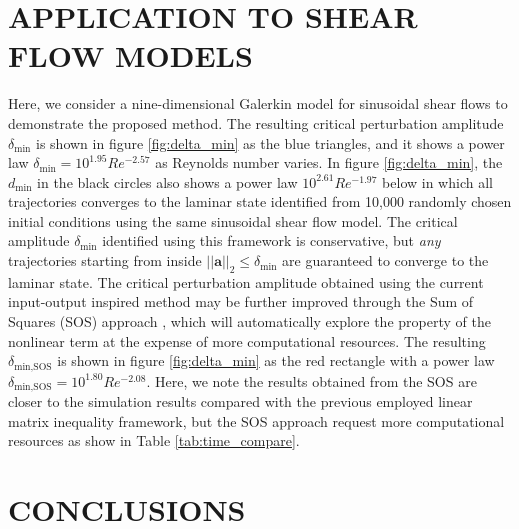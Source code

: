 \documentclass[10pt, a4paper]{article}
\begin{document}
\vspace{-2mm}
\section{APPLICATION TO SHEAR FLOW MODELS}
\vspace{-2mm}



Here, we consider a nine-dimensional Galerkin model \citep{Moehlis2004} for sinusoidal shear flows to demonstrate the proposed method. The resulting critical perturbation amplitude $\delta_{\text{min}}$ is shown in figure \ref{fig:delta_min} as the blue triangles, and it shows a power law $\delta_{\text{min}}=10^{1.95}Re^{-2.57}$ as Reynolds number varies. In figure \ref{fig:delta_min}, the $d_{\text{min}}$ in the black circles also shows a power law $10^{2.61}Re^{-1.97}$ below in which all trajectories converges to the laminar state identified from 10,000 randomly chosen initial conditions \citep{Joglekar2015} using the same sinusoidal shear flow model. The critical amplitude $\delta_{\text{min}}$ identified using this framework is conservative, but \emph{any} trajectories starting from inside $||\boldsymbol{a}||_2\leq \delta_{\text{min}}$ are guaranteed to converge to the laminar state. The critical perturbation amplitude obtained using the current input-output inspired method may be further improved through the Sum of Squares (SOS) approach \citep{papachristodoulou2013sostools}, which will automatically explore the property of the nonlinear term at the expense of more computational resources. The resulting $\delta_{\text{min,SOS}}$ is shown in figure \ref{fig:delta_min} as the red rectangle with a power law $\delta_{\text{min,SOS}}=10^{1.80}Re^{-2.08}$. Here, we note the results obtained from the SOS are closer to the simulation results compared with the previous employed linear matrix inequality framework, but the SOS approach request more computational resources as show in Table \ref{tab:time_compare}. 




\vspace{-2mm}
\section{CONCLUSIONS}
\vspace{-2mm}
\end{document}
